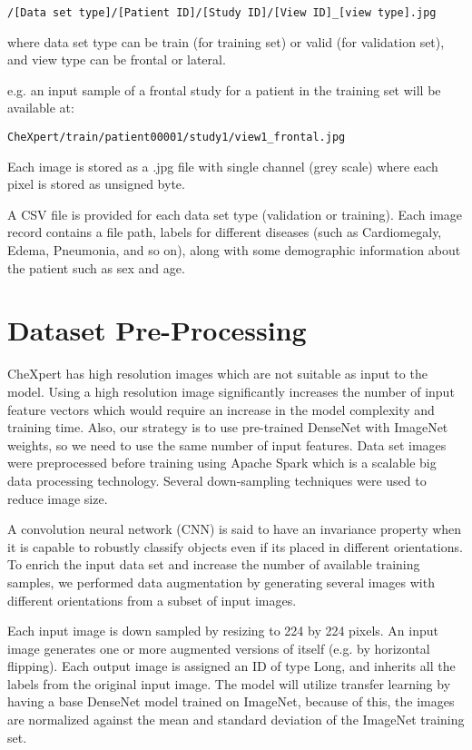 \documentclass{amia}
\begin{document}
\newcommand{\code}[1]{\colorbox{light-gray}{\texttt{#1}}}

\code{/[Data set type]/[Patient ID]/[Study ID]/[View ID]\_[view type].jpg}

where data set type can be train (for training set) or valid (for validation set), and view type can be frontal or lateral.

e.g. an input sample of a frontal study for a patient in the training set will be available at:

\code{CheXpert/train/patient00001/study1/view1\_frontal.jpg}

Each image is stored as a .jpg file with single channel (grey scale) where each pixel is stored as unsigned byte.

A CSV file is provided for each data set type (validation or training). Each image record contains a file path, labels for different diseases (such as Cardiomegaly, Edema, Pneumonia, and so on), along with some demographic information about the patient such as sex and age.


\section*{Dataset Pre-Processing}

CheXpert\cite{ref2} has high resolution images which are not suitable as input to the model. Using a high resolution image significantly increases the number of input feature vectors which would require an increase in the model complexity and training time. Also, our strategy is to use pre-trained DenseNet with ImageNet weights, so we need to use the same number of input features. Data set images were preprocessed before training using Apache Spark which is a scalable big data processing technology. Several down-sampling techniques were used to reduce image size.

A convolution neural network (CNN) is said to have an invariance property when it is capable to robustly classify objects even if its placed in different orientations. To enrich the input data set and increase the number of available training samples, we performed data augmentation by generating several images with different orientations from a subset of input images.

Each input image is down sampled by resizing to 224 by 224 pixels. An input image generates one or more augmented versions of itself (e.g. by horizontal flipping). Each output image is assigned an ID of type Long, and inherits all the labels from the original input image. The model will utilize transfer learning by having a base DenseNet model trained on ImageNet, because of this, the images are normalized against the mean and standard deviation of the ImageNet training set.
\end{document}
